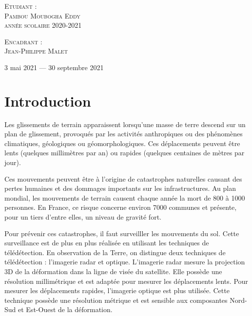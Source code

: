 \documentclass[11pt, openany]{report}
\begin{document}
\begin{titlepage}
\begin{sffamily}
\begin{center}
    \begin{minipage}{0.4\textwidth}
      \begin{flushleft} \large
      	\textsc{Etudiant :}\\ 
        \textsc{Pambou Moubogha Eddy}\\
         \textsc{année scolaire 2020-2021}\\
      \end{flushleft}
    \end{minipage}
    \begin{minipage}{0.4\textwidth}
      \begin{flushright} \large
        \textsc{Encadrant :}\\ 
        \textsc{Jean-Philippe Malet}\\
      \end{flushright}
    \end{minipage}

    \vfill

    {\large 3 mai 2021 — 30 septembre 2021}

  \end{center}
  \end{sffamily}
\end{titlepage}
\newpage
\tableofcontents
\chapter{Introduction}
Les glissements de terrain apparaissent lorsqu'une masse de terre descend sur un plan de glissement, provoqués par les activités anthropiques ou des phénomènes climatiques, géologiques ou géomorphologiques.
Ces déplacements peuvent être lents (quelques millimètres par an) ou rapides (quelques centaines de mètres par jour). \par

Ces mouvements peuvent être à l'origine de catastrophes naturelles causant des pertes humaines et des dommages importants sur les infrastructures. Au plan mondial, les mouvements de terrain causent chaque année la mort de 800 à 1000 personnes. En France, ce risque concerne environ 7000 communes et présente, pour un tiers d’entre elles, un niveau de gravité fort.\par

Pour prévenir ces catastrophes, il faut surveilller les mouvements du sol. Cette surveillance est de plus en plus réalisée en utilisant les techniques de télédétection. En observation de la Terre, on distingue deux techniques de télédétection : l'imagerie radar et optique. L'imagerie radar mesure la projection 3D de la déformation dans la ligne de visée du satellite. Elle possède une résolution millimétrique et est adaptée pour mesurer les déplacements lents. Pour mesurer les déplacements rapides, l'imagerie optique est plus utilisée. Cette technique possède une résolution métrique et est sensible aux composantes Nord-Sud et Est-Ouest de la déformation.
\end{document}
